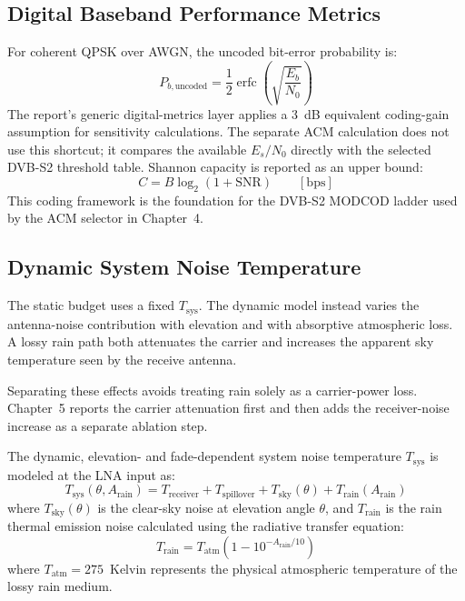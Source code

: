 \subsection{Digital Baseband Performance Metrics}
For coherent QPSK over AWGN, the uncoded bit-error probability is:
\begin{equation}
    P_{b,\mathrm{uncoded}}
    =
    \frac{1}{2}\operatorname{erfc}\left(\sqrt{\frac{E_b}{N_0}}\right)
\end{equation}
The report's generic digital-metrics layer applies a 3~dB equivalent coding-gain assumption for sensitivity calculations. The separate ACM calculation does not use this shortcut; it compares the available $E_s/N_0$ directly with the selected DVB-S2 threshold table. Shannon capacity is reported as an upper bound:
\begin{equation}
    C
    =
    B\log_{2}\left(1+\mathrm{SNR}\right)
    \qquad [\mathrm{bps}]
\end{equation}
This coding framework is the foundation for the DVB-S2 MODCOD ladder used by the ACM selector in Chapter~4.

\subsection{Dynamic System Noise Temperature}
The static budget uses a fixed $T_{\mathrm{sys}}$. The dynamic model instead varies the antenna-noise contribution with elevation and with absorptive atmospheric loss. A lossy rain path both attenuates the carrier and increases the apparent sky temperature seen by the receive antenna.

Separating these effects avoids treating rain solely as a carrier-power loss. Chapter~5 reports the carrier attenuation first and then adds the receiver-noise increase as a separate ablation step.

The dynamic, elevation- and fade-dependent system noise temperature $T_{\mathrm{sys}}$ is modeled at the LNA input as:
\begin{equation}
    T_{\mathrm{sys}}(\theta, A_{\mathrm{rain}}) = T_{\mathrm{receiver}} + T_{\mathrm{spillover}} + T_{\mathrm{sky}}(\theta) + T_{\mathrm{rain}}(A_{\mathrm{rain}})
\end{equation}
where $T_{\mathrm{sky}}(\theta)$ is the clear-sky noise at elevation angle $\theta$, and $T_{\mathrm{rain}}$ is the rain thermal emission noise calculated using the radiative transfer equation:
\begin{equation}
    T_{\mathrm{rain}} = T_{\mathrm{atm}} \left( 1 - 10^{-A_{\mathrm{rain}}/10} \right)
\end{equation}
where $T_{\mathrm{atm}} = 275$~Kelvin represents the physical atmospheric temperature of the lossy rain medium.

